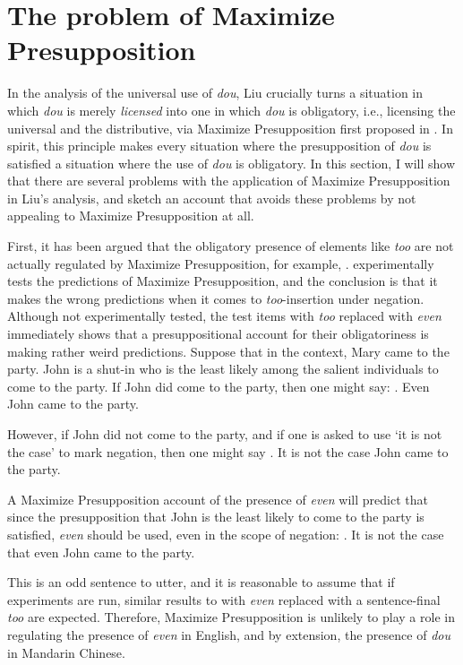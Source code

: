 \documentclass[12pt]{article}
\begin{document}
\section{The problem of Maximize Presupposition}
\label{sec:maximize_presupposition}

In the analysis of the universal use of \emph{dou}, Liu crucially turns a situation in which \emph{dou} is merely \emph{licensed} into one in which \emph{dou} is obligatory, i.e., licensing the universal and the distributive, via Maximize Presupposition first proposed in \citet{heimArtikelUndDefinitheit1991}.
In spirit, this principle makes every situation where the presupposition of \emph{dou} is satisfied a situation where the use of \emph{dou} is obligatory.
In this section, I will show that there are several problems with the application of Maximize Presupposition in Liu's analysis, and sketch an account that avoids these problems by not appealing to Maximize Presupposition at all.

First, it has been argued that the obligatory presence of elements like \emph{too} are not actually regulated by Maximize Presupposition, for example, \citet{badeCrosslinguisticViewObligatory2021}.
\citet{badeCrosslinguisticViewObligatory2021} experimentally tests the predictions of Maximize Presupposition, and the conclusion is that it makes the wrong predictions when it comes to \emph{too}-insertion under negation.
Although not experimentally tested, the test items with \emph{too} replaced with \emph{even} immediately shows that a presuppositional account for their obligatoriness is making rather weird predictions.
Suppose that in the context, Mary came to the party.
John is a shut-in who is the least likely among the salient individuals to come to the party.
If John did come to the party, then one might say:
\ex. Even John came to the party.

However, if John did not come to the party, and if one is asked to use `it is not the case' to mark negation, then one might say
\ex. It is not the case John came to the party.

A Maximize Presupposition account of the presence of \emph{even} will predict that since the presupposition that John is the least likely to come to the party is satisfied, \emph{even} should be used, even in the scope of negation:
\ex. It is not the case that even John came to the party.

This is an odd sentence to utter, and it is reasonable to assume that if experiments are run, similar results to \Last with \emph{even} replaced with a sentence-final \emph{too} are expected.
Therefore, Maximize Presupposition is unlikely to play a role in regulating the presence of \emph{even} in English, and by extension, the presence of \emph{dou} in Mandarin Chinese.
\end{document}
